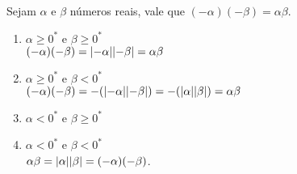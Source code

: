 \documentclass[../main.tex]{subfiles}
\begin{document}
\begin{prop}\label{reais-prop-regraSinaisProduto}
    Sejam $\alpha$ e $\beta$ números reais, vale que $\left( -\alpha \right) \left( -\beta \right) = \alpha \beta$.
\end{prop}
\begin{dem}
    \begin{enumerate}
        \item $\alpha \geq 0^*$ e $\beta \geq 0^*$ \\
            $(-\alpha)(-\beta) = \abs{-\alpha}\abs{-\beta} = \alpha\beta$
        
        \item $\alpha \geq 0^*$ e $\beta < 0^*$ \\
            $(-\alpha)(-\beta) = -(\abs{-\alpha}\abs{-\beta}) = -(\abs{\alpha}\abs{\beta}) = \alpha\beta $
        \item $\alpha < 0^*$ e $\beta \geq 0^*$ \\
         
        \item $\alpha < 0^*$ e $\beta < 0^*$ \\
            $\alpha\beta = \abs{\alpha}\abs{\beta} = (-\alpha)(-\beta)$.
    \end{enumerate}
\end{dem}
\end{document}
